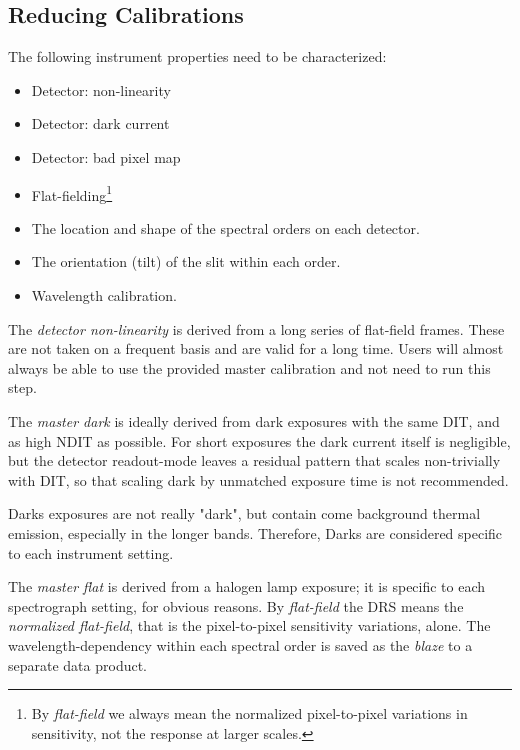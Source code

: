 
\subsection{Reducing Calibrations}
\label{sec:calib:reduc}

The following instrument properties need to be characterized:
\begin{itemize}
    \item Detector: non-linearity
    \item Detector: dark current
    \item Detector: bad pixel map
    \item Flat-fielding\footnote{By \textit{flat-field} we always mean the
              normalized pixel-to-pixel variations
              in sensitivity, not the response at larger scales.}
    \item The location and shape of the spectral orders on each detector.
    \item The orientation (tilt) of the slit within each order.
    \item Wavelength calibration.
\end{itemize}

The \emph{detector non-linearity} is derived from a long series of flat-field
frames. These are not taken on a frequent basis and are valid for a long time.
Users will almost always be able to use the provided master calibration and not
need to run this step.

The \emph{master dark} is ideally derived from dark exposures with the
same DIT, and as high NDIT as possible. For short exposures the dark current
itself is negligible, but the detector readout-mode leaves a residual pattern
that scales non-trivially with DIT, so that scaling dark by unmatched exposure
time is not recommended.

Darks exposures are not really "dark", but contain come background thermal emission,
especially in the longer bands. Therefore, Darks are considered specific to
each instrument setting.

The \emph{master flat} is derived from a halogen lamp exposure; it is specific
to each spectrograph setting, for obvious reasons. By \emph{flat-field} the DRS
means the \emph{normalized flat-field}, that is the pixel-to-pixel sensitivity
variations, alone. The wavelength-dependency within each spectral order is
saved as the \emph{blaze} to a separate data product.

